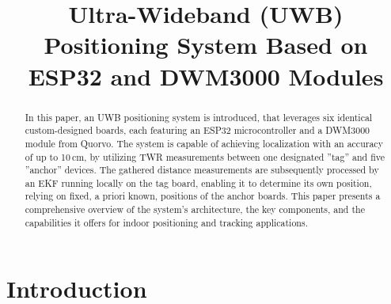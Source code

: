\documentclass[conference, a4paper]{IEEEtran}
\begin{document}
\renewcommand{\baselinestretch}{0.97} %

\title{Ultra-Wideband (UWB) Positioning System Based on ESP32 and DWM3000 Modules}

\author{  
   \and
   
  }

\maketitle

\begin{abstract}
  In this paper, an \ac{UWB} positioning system is introduced, that leverages six identical custom-designed boards, each featuring an ESP32 microcontroller and a DWM3000 module from Quorvo.
  \newline
  The system is capable of achieving localization with an accuracy of up to 10\,cm, by utilizing \ac{TWR} measurements between one designated ''tag'' and five ''anchor'' devices.
  The gathered distance measurements are subsequently processed by an \ac{EKF} running locally on the tag board, enabling it to determine its own position,
  relying on fixed, a priori known, positions of the anchor boards.
  \newline
  This paper presents a comprehensive overview of the system's architecture, the key components, and the capabilities it offers for indoor positioning and tracking applications.
\end{abstract}


\IEEEpeerreviewmaketitle


\section{Introduction}
\label{sec:Introduction}
\end{document}
